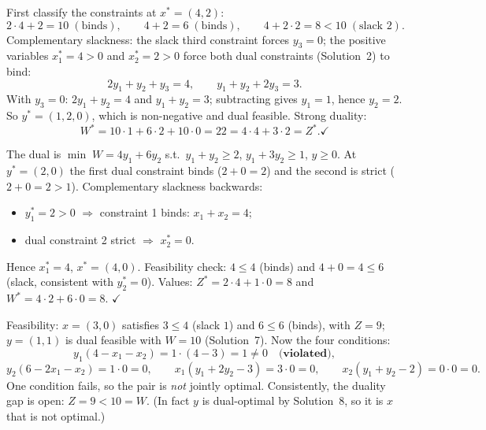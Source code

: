 \begin{solutions}
  \item First classify the constraints at $x^{*}=(4,2)$:
        \[
          2\cdot 4+2=10 \;(\text{binds}),\qquad
          4+2=6 \;(\text{binds}),\qquad
          4+2\cdot 2=8<10 \;(\text{slack }2).
        \]
        Complementary slackness: the slack third constraint forces
        $y_{3}=0$; the positive variables $x_{1}^{*}=4>0$ and
        $x_{2}^{*}=2>0$ force both dual constraints (Solution~2) to bind:
        \[
          2y_{1}+y_{2}+y_{3}=4,\qquad y_{1}+y_{2}+2y_{3}=3 .
        \]
        With $y_{3}=0$: $2y_{1}+y_{2}=4$ and $y_{1}+y_{2}=3$; subtracting
        gives $y_{1}=1$, hence $y_{2}=2$. So $y^{*}=(1,2,0)$, which is
        non-negative and dual feasible. Strong duality:
        \[
          W^{*}=10\cdot 1+6\cdot 2+10\cdot 0=22
          = 4\cdot 4+3\cdot 2 = Z^{*}. \checkmark
        \]

  \item The dual is
        $\min\; W=4y_{1}+6y_{2}$ s.t.\ $y_{1}+y_{2}\ge 2$,
        $y_{1}+3y_{2}\ge 1$, $y\ge 0$. At $y^{*}=(2,0)$ the first dual
        constraint binds ($2+0=2$) and the second is strict
        ($2+0=2>1$). Complementary slackness backwards:
        \begin{itemize}[leftmargin=1.6em,itemsep=0.3ex]
          \item $y_{1}^{*}=2>0$ $\Rightarrow$ constraint 1 binds:
                $x_{1}+x_{2}=4$;
          \item dual constraint 2 strict $\Rightarrow$ $x_{2}^{*}=0$.
        \end{itemize}
        Hence $x_{1}^{*}=4$, $x^{*}=(4,0)$. Feasibility check:
        $4\le 4$ (binds) and $4+0=4\le 6$ (slack, consistent with
        $y_{2}^{*}=0$). Values:
        $Z^{*}=2\cdot 4+1\cdot 0=8$ and $W^{*}=4\cdot 2+6\cdot 0=8$.
        $\checkmark$

  \item Feasibility: $x=(3,0)$ satisfies $3\le 4$ (slack $1$) and
        $6\le 6$ (binds), with $Z=9$; $y=(1,1)$ is dual feasible with
        $W=10$ (Solution~7). Now the four conditions:
        \[
          y_{1}(4-x_{1}-x_{2})=1\cdot(4-3)=1\ne 0
          \quad\textbf{(violated)},
        \]
        \[
          y_{2}(6-2x_{1}-x_{2})=1\cdot 0=0,\qquad
          x_{1}(y_{1}+2y_{2}-3)=3\cdot 0=0,\qquad
          x_{2}(y_{1}+y_{2}-2)=0\cdot 0=0 .
        \]
        One condition fails, so the pair is \emph{not} jointly optimal.
        Consistently, the duality gap is open: $Z=9<10=W$. (In fact $y$
        is dual-optimal by Solution~8, so it is $x$ that is not optimal.)


\end{solutions}
